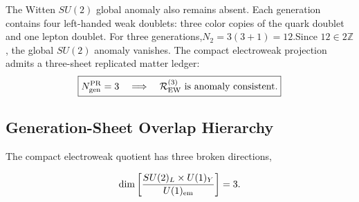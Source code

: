 \documentclass[11pt]{article}
\begin{document}
The Witten \(SU(2)\) global anomaly also remains absent. 
Each generation contains four left-handed weak doublets: three color copies of the quark doublet and one lepton doublet. For three generations,$N_2=3(3+1)=12$.Since $12\in2\mathbb Z$, the global \(SU(2)\) anomaly vanishes. The compact electroweak projection admits a three-sheet replicated matter ledger:
\begin{equation}
\boxed{
N_{\rm gen}^{\rm PR}=3
\quad
\Longrightarrow
\quad
\mathcal R_{\rm EW}^{(3)}
\ \text{is anomaly consistent}.
}
\end{equation}

\subsection{Generation-Sheet Overlap Hierarchy}
\label{sec:pr2_generation_sheet_overlap_hierarchy_main}

The compact electroweak quotient has three broken directions, 

\begin{equation}
\dim \left[\frac{SU(2)_L\times U(1)_Y}{U(1)_{\rm em}} \right] = 3. 
\end{equation}
\end{document}
